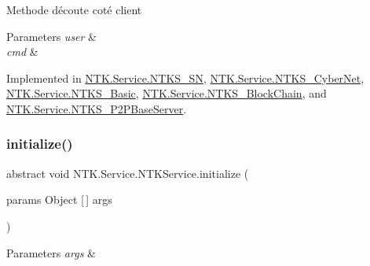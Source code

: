 Methode d\textquotesingle{}écoute coté client 


\begin{DoxyParams}{Parameters}
{\em user} & \\
\hline
{\em cmd} & \\
\hline
\end{DoxyParams}


Implemented in \mbox{\hyperlink{class_n_t_k_1_1_service_1_1_n_t_k_s___s_n_a70710f4c30863d2cab91c62b9f52a040}{N\+T\+K.\+Service.\+N\+T\+K\+S\+\_\+\+SN}}, \mbox{\hyperlink{class_n_t_k_1_1_service_1_1_n_t_k_s___cyber_net_ac70faa17037f8ac3fab6f6a4481075ac}{N\+T\+K.\+Service.\+N\+T\+K\+S\+\_\+\+Cyber\+Net}}, \mbox{\hyperlink{class_n_t_k_1_1_service_1_1_n_t_k_s___basic_ae1e2c161689f944100438bcd61c9a99e}{N\+T\+K.\+Service.\+N\+T\+K\+S\+\_\+\+Basic}}, \mbox{\hyperlink{class_n_t_k_1_1_service_1_1_n_t_k_s___block_chain_ab8f7f1e5874fb416928cf2fd2743be83}{N\+T\+K.\+Service.\+N\+T\+K\+S\+\_\+\+Block\+Chain}}, and \mbox{\hyperlink{class_n_t_k_1_1_service_1_1_n_t_k_s___p2_p_base_server_a0e5648a55fed5c3b8acd1d3cb14151f8}{N\+T\+K.\+Service.\+N\+T\+K\+S\+\_\+\+P2\+P\+Base\+Server}}.

\mbox{\label{class_n_t_k_1_1_service_1_1_n_t_k_service_a054248d5e9d86a488d81afe35043da94}} 
\subsubsection{\texorpdfstring{initialize()}{initialize()}}
{\footnotesize\ttfamily abstract void N\+T\+K.\+Service.\+N\+T\+K\+Service.\+initialize (\begin{DoxyParamCaption}\item[{params Object \mbox{[}$\,$\mbox{]}}]{args }\end{DoxyParamCaption})\hspace{0.3cm}{\ttfamily [pure virtual]}}






\begin{DoxyParams}{Parameters}
{\em args} & \\
\hline
\end{DoxyParams}
\mbox{\label{class_n_t_k_1_1_service_1_1_n_t_k_service_ac628c21c8284aedd78b4483d423dd2e4}} 
